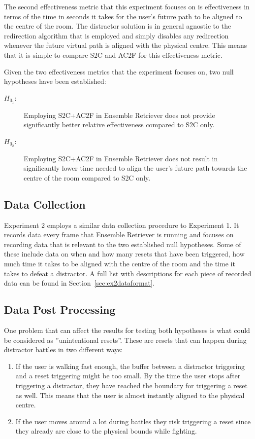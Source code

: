 The second effectiveness metric that this experiment focuses on is effectiveness in terms of the time in seconds it takes for the user's future path to be aligned to the centre of the room. The distractor solution is in general agnostic to the redirection algorithm that is employed and simply disables any redirection whenever the future virtual path is aligned with the physical centre. This means that it is simple to compare S2C and AC2F for this effectiveness metric.

Given the two effectiveness metrics that the experiment focuses on, two null hypotheses have been established:
\begin{description}
  \item[$H_{0_1}$:] Employing S2C+AC2F in Ensemble Retriever does not provide significantly better relative effectiveness compared to S2C only. 
  \item[$H_{0_2}$:] Employing S2C+AC2F in Ensemble Retriever does not result in significantly lower time needed to align the user's future path towards the centre of the room compared to S2C only.
\end{description}


\subsection{Data Collection}
Experiment 2 employs a similar data collection procedure to Experiment 1. It records data every frame that Ensemble Retriever is running and focuses on recording data that is relevant to the two established null hypotheses. Some of these include data on when and how many resets that have been triggered, how much time it takes to be aligned with the centre of the room and the time it takes to defeat a distractor. A full list with descriptions for each piece of recorded data can be found in Section~\ref{sec:ex2dataformat}. 

\subsection{Data Post Processing}\label{sec:ex2postprocessing}
One problem that can affect the results for testing both hypotheses is what could be considered as ''unintentional resets''. These are resets that can happen during distractor battles in two different ways:
\begin{enumerate}
    \item If the user is walking fast enough, the buffer between a distractor triggering and a reset triggering might be too small. By the time the user stops after triggering a distractor, they have reached the boundary for triggering a reset as well. This means that the user is almost instantly aligned to the physical centre. 
    \item If the user moves around a lot during battles they risk triggering a reset since they already are close to the physical bounds while fighting. 
\end{enumerate}


